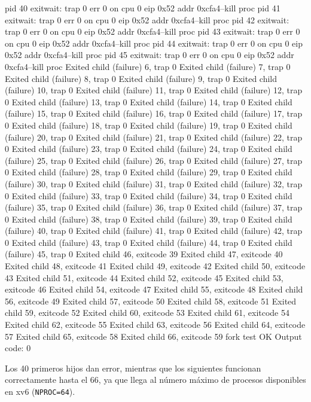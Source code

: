 \begin{listing}[style=consola]
    pid 40 exitwait: trap 0 err 0 on cpu 0 eip 0x52 addr 0xcfa4--kill proc
    pid 41 exitwait: trap 0 err 0 on cpu 0 eip 0x52 addr 0xcfa4--kill proc
    pid 42 exitwait: trap 0 err 0 on cpu 0 eip 0x52 addr 0xcfa4--kill proc
    pid 43 exitwait: trap 0 err 0 on cpu 0 eip 0x52 addr 0xcfa4--kill proc
    pid 44 exitwait: trap 0 err 0 on cpu 0 eip 0x52 addr 0xcfa4--kill proc
    pid 45 exitwait: trap 0 err 0 on cpu 0 eip 0x52 addr 0xcfa4--kill proc
    Exited child (failure) 6, trap 0
    Exited child (failure) 7, trap 0
    Exited child (failure) 8, trap 0
    Exited child (failure) 9, trap 0
    Exited child (failure) 10, trap 0
    Exited child (failure) 11, trap 0
    Exited child (failure) 12, trap 0
    Exited child (failure) 13, trap 0
    Exited child (failure) 14, trap 0
    Exited child (failure) 15, trap 0
    Exited child (failure) 16, trap 0
    Exited child (failure) 17, trap 0
    Exited child (failure) 18, trap 0
    Exited child (failure) 19, trap 0
    Exited child (failure) 20, trap 0
    Exited child (failure) 21, trap 0
    Exited child (failure) 22, trap 0
    Exited child (failure) 23, trap 0
    Exited child (failure) 24, trap 0
    Exited child (failure) 25, trap 0
    Exited child (failure) 26, trap 0
    Exited child (failure) 27, trap 0
    Exited child (failure) 28, trap 0
    Exited child (failure) 29, trap 0
    Exited child (failure) 30, trap 0
    Exited child (failure) 31, trap 0
    Exited child (failure) 32, trap 0
    Exited child (failure) 33, trap 0
    Exited child (failure) 34, trap 0
    Exited child (failure) 35, trap 0
    Exited child (failure) 36, trap 0
    Exited child (failure) 37, trap 0
    Exited child (failure) 38, trap 0
    Exited child (failure) 39, trap 0
    Exited child (failure) 40, trap 0
    Exited child (failure) 41, trap 0
    Exited child (failure) 42, trap 0
    Exited child (failure) 43, trap 0
    Exited child (failure) 44, trap 0
    Exited child (failure) 45, trap 0
    Exited child 46, exitcode 39
    Exited child 47, exitcode 40
    Exited child 48, exitcode 41
    Exited child 49, exitcode 42
    Exited child 50, exitcode 43
    Exited child 51, exitcode 44
    Exited child 52, exitcode 45
    Exited child 53, exitcode 46
    Exited child 54, exitcode 47
    Exited child 55, exitcode 48
    Exited child 56, exitcode 49
    Exited child 57, exitcode 50
    Exited child 58, exitcode 51
    Exited child 59, exitcode 52
    Exited child 60, exitcode 53
    Exited child 61, exitcode 54
    Exited child 62, exitcode 55
    Exited child 63, exitcode 56
    Exited child 64, exitcode 57
    Exited child 65, exitcode 58
    Exited child 66, exitcode 59
    fork test OK
    Output code: 0
\end{listing}

\par Los 40 primeros hijos dan error, mientras que los siguientes
funcionan correctamente hasta el 66, ya que llega al número máximo
de procesos disponibles en xv6 (\texttt{NPROC=64}).